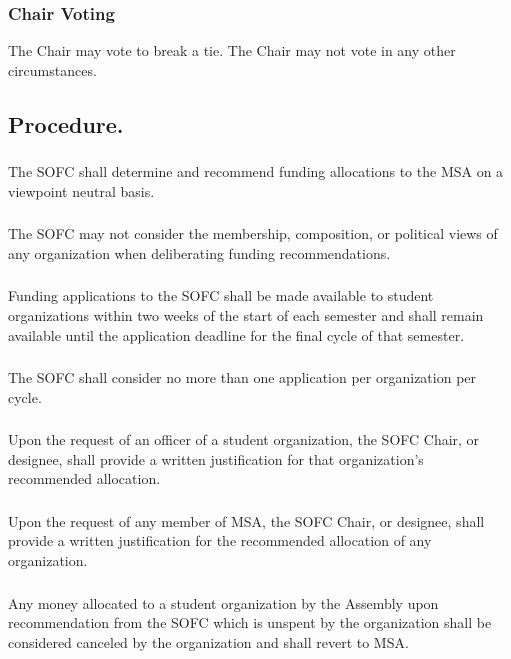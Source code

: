 \subsubsection{Chair Voting}
\subsubsubsection{}
The Chair may vote to break a tie.
\subsubsubsection{}
The Chair may not vote in any other circumstances.

\subsection{Procedure.}
\subsubsection{}
The SOFC shall determine and recommend funding allocations to the MSA on a viewpoint neutral basis.
\subsubsection{}
The SOFC may not consider the membership, composition, or political views of any organization when deliberating funding recommendations.
\subsubsection{}
Funding applications to the SOFC shall be made available to student organizations within two weeks of the start of each semester and shall remain available until the application deadline for the final cycle of that semester.
\subsubsection{}
The SOFC shall consider no more than one application per organization per cycle.
\subsubsection{}
Upon the request of an officer of a student organization, the SOFC Chair, or designee, shall provide a written justification for that organization's recommended allocation.
\subsubsection{}
Upon the request of any member of MSA, the SOFC Chair, or designee, shall provide a written justification for the recommended allocation of any organization.
\subsubsection{}
Any money allocated to a student organization by the Assembly upon recommendation from the SOFC which is unspent by the organization shall be considered canceled by the organization and shall revert to MSA.

